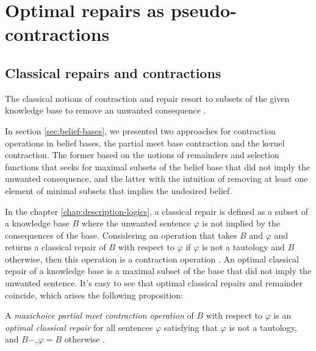 
\chapter{Optimal repairs as pseudo-contractions}

\section{Classical repairs and contractions}

The classical notions of contraction and repair resort to subsets of the given knowledge base to remove an unwanted consequence \citep{Baader-SAC23}. 

In section \ref{sec:belief-bases}, we presented two approaches for contraction operations in belief bases, the partial meet base contraction and the kernel contraction. The former based on the notions of remainders and selection functions that seeks for maximal subsets of the belief base that did not imply the unwanted consequence, and the latter with the intuition of removing at least one element of minimal subsets that implies the undesired belief.

In the chapter \ref{chap:description-logics}, a classical repair is defined as a subset of a knowledge base $B$ where the unwanted sentence $\varphi$ is not implied by the consequences of the base. Considering an operation that takes $B$ and $\varphi$ and returns a classical repair of $B$ with respect to $\varphi$ if $\varphi$ is not a tautology and $B$ otherwise, then this operation is a contraction operation \citep{Baader-SAC23, Matos2019}. An optimal classical repair of a knowledge base is a maximal subset of the base that did not imply the unwanted sentence. It's easy to see that optimal classical repairs and remainder coincide, which arises the following proposition:

\begin{proposition}
    A \textit{maxichoice partial meet contraction operation} of $B$ with respect to $\varphi$ is an \textit{optimal classical repair} for all sentences $\varphi$ satisfying that $\varphi$ is not a tautology, and $B -_{\gamma} \varphi = B$ otherwise \citep{Baader-SAC23}.
\end{proposition}

